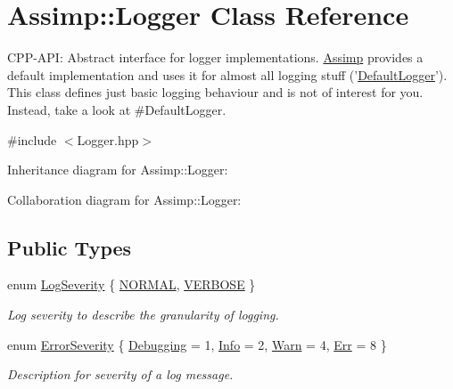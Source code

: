 \hypertarget{class_assimp_1_1_logger}{\section{Assimp\+:\+:Logger Class Reference}
\label{class_assimp_1_1_logger}
}


C\+P\+P-\/\+A\+P\+I\+: Abstract interface for logger implementations. \hyperlink{class_assimp}{Assimp} provides a default implementation and uses it for almost all logging stuff ('\hyperlink{class_assimp_1_1_default_logger}{Default\+Logger}'). This class defines just basic logging behaviour and is not of interest for you. Instead, take a look at \#\+Default\+Logger.  




{\ttfamily \#include $<$Logger.\+hpp$>$}



Inheritance diagram for Assimp\+:\+:Logger\+:


Collaboration diagram for Assimp\+:\+:Logger\+:
\subsection*{Public Types}
\begin{DoxyCompactItemize}
\item 
enum \hyperlink{class_assimp_1_1_logger_a8b6248a0fd062431e8572556350d29e6}{Log\+Severity} \{ \hyperlink{class_assimp_1_1_logger_a8b6248a0fd062431e8572556350d29e6a79d16f85dc21486ee489f300027e8eda}{N\+O\+R\+M\+A\+L}, 
\hyperlink{class_assimp_1_1_logger_a8b6248a0fd062431e8572556350d29e6afc9d1d86aa82fdb80e00c99b3c1ce486}{V\+E\+R\+B\+O\+S\+E}
 \}
\begin{DoxyCompactList}\small\item\em Log severity to describe the granularity of logging. \end{DoxyCompactList}\item 
enum \hyperlink{class_assimp_1_1_logger_acd0b52a87d6fc11e957ed2c6e2ad75b6}{Error\+Severity} \{ \hyperlink{class_assimp_1_1_logger_acd0b52a87d6fc11e957ed2c6e2ad75b6a0cb475014d27098c3423738c571d857f}{Debugging} = 1, 
\hyperlink{class_assimp_1_1_logger_acd0b52a87d6fc11e957ed2c6e2ad75b6aa3377a574928b86f7de55c5df154f461}{Info} = 2, 
\hyperlink{class_assimp_1_1_logger_acd0b52a87d6fc11e957ed2c6e2ad75b6a1279c77aaee5a3d7df835a9b9305a697}{Warn} = 4, 
\hyperlink{class_assimp_1_1_logger_acd0b52a87d6fc11e957ed2c6e2ad75b6a71054d0b1323abcea46d050d69013d27}{Err} = 8
 \}
\begin{DoxyCompactList}\small\item\em Description for severity of a log message. \end{DoxyCompactList}\end{DoxyCompactItemize}
